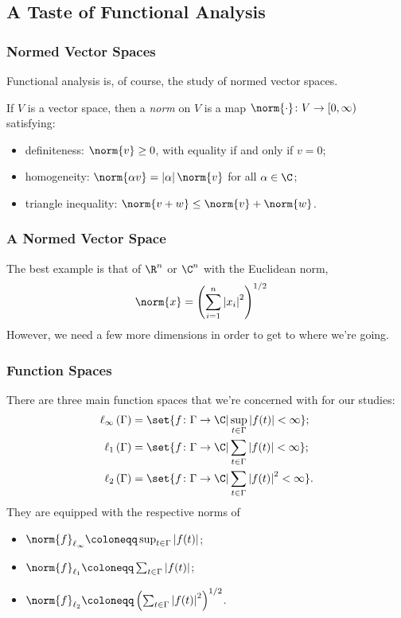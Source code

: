 \documentclass{beamer-custom}
\begin{document}
\subsection{A Taste of Functional Analysis}%
\begin{frame}
  \frametitle{Normed Vector Spaces}
  Functional analysis is, of course, the study of normed vector spaces.\pause\newline

  If $V$ is a vector space, then a \textit{norm} on $V$ is a map $\norm{\cdot}\colon V\rightarrow [0,\infty)$ satisfying:
  \begin{itemize}
    \item definiteness: $\norm{v} \geq 0$, with equality if and only if $v = 0$;
    \item homogeneity: $\norm{\alpha v} = \left\vert \alpha \right\vert\norm{v}$ for all $\alpha\in \C$;
    \item triangle inequality: $\norm{v + w}\leq \norm{v} + \norm{w}$.
  \end{itemize}
\end{frame}
\begin{frame}
  \frametitle{A Normed Vector Space}
  The best example is that of $\R^n$ or $\C^n$ with the Euclidean norm,
  \begin{align*}
    \norm{x} &= \left( \sum_{i=1}^{n}\left\vert x_i \right\vert^2 \right)^{1/2}
  \end{align*}
  However, we need a few more dimensions in order to get to where we're going.
\end{frame}
\begin{frame}
  \frametitle{Function Spaces}
  There are three main function spaces that we're concerned with for our studies:
  { \footnotesize \begin{align*}
    \ell_{\infty}\left( \Gamma \right) & =\set{f\colon \Gamma\rightarrow \C | \sup_{t\in\Gamma}\left\vert f(t) \right\vert < \infty};\\
    \ell_{1}\left( \Gamma \right) &= \set{f\colon \Gamma\rightarrow \C | \sum_{t\in\Gamma}\left\vert f(t) \right\vert < \infty};\\
    \ell_2\left( \Gamma \right) &= \set{f\colon \Gamma\rightarrow \C | \sum_{t\in\Gamma}\left\vert f(t) \right\vert^2 < \infty}.
  \end{align*}}\pause
  They are equipped with the respective norms of
  \begin{itemize}
    \item $\norm{f}_{\ell_{\infty}} \coloneqq \sup_{t\in\Gamma}\left\vert f(t) \right\vert$;
    \item $\norm{f}_{\ell_1}\coloneqq \sum_{t\in\Gamma}\left\vert f(t) \right\vert$;
    \item $\norm{f}_{\ell_2}\coloneqq \left( \sum_{t\in\Gamma}\left\vert f(t) \right\vert^2 \right)^{1/2}$.
  \end{itemize}
\end{frame}
\end{document}
